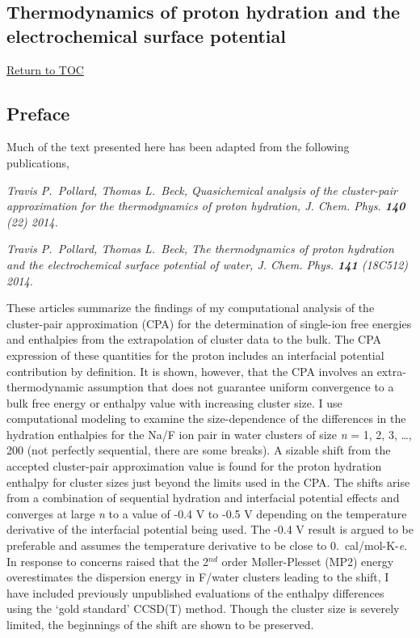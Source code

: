 \begin{cpa}
 \chapter{Thermodynamics of proton hydration and the electrochemical surface potential}
 \hyperlink{toc}{Return to TOC}
  \section{\label{ch5:sec0:level1}Preface}
  Much of the text presented here has been adapted from the following publications,
  
  \vspace{12pt}
  \noindent \emph{Travis P.~Pollard, Thomas L.~Beck, Quasichemical analysis of the cluster-pair approximation for the thermodynamics of proton hydration, 
  J. Chem. Phys. \textbf{140} (22) 2014.}

  \noindent \emph{Travis P.~Pollard, Thomas L.~Beck, The thermodynamics of proton hydration and the electrochemical surface potential of water, J. Chem. Phys. 
  \textbf{141} (18C512) 2014.}
  \vspace{12pt}
  
  These articles summarize the findings of my computational analysis of the cluster-pair approximation (CPA) for the determination of single-ion free energies and
  enthalpies from the extrapolation of cluster data to the bulk. The CPA expression of these quantities for the proton includes an interfacial potential 
  contribution by definition. It is shown, however, that the CPA involves an extra-thermodynamic assumption that does not guarantee uniform convergence to a bulk 
  free energy or enthalpy value with increasing cluster size. I use computational modeling to examine the size-dependence of the differences in the hydration enthalpies 
  for the Na\sur{+}/F\sur{-} ion pair in water clusters of size \emph{n} = 1, 2, 3, \dots, 200 (not perfectly sequential, there are some breaks). A sizable shift from
  the accepted cluster-pair approximation value is found for the proton hydration enthalpy for cluster sizes just beyond the limits used in the CPA. The shifts arise 
  from a combination of sequential hydration and interfacial potential effects and converges at large \emph{n} to a value of -0.4 V to -0.5 V depending on the
  temperature derivative of the interfacial potential being used. The -0.4 V result is argued to be preferable and assumes the temperature derivative to be close to
  0.~cal/mol-K-\emph{e}. In response to concerns raised that the 2$^{nd}$ order M$\text{\o}$ller-Plesset (MP2) energy overestimates the dispersion energy in 
  F\sur{-}/water clusters leading to the shift\cite{herbert2014personal}, I have included previously unpublished evaluations of the enthalpy differences using the 
  `gold standard' CCSD(T) method. Though the cluster size is severely limited, the beginnings of the shift are shown to be preserved.
  

\end{cpa}
